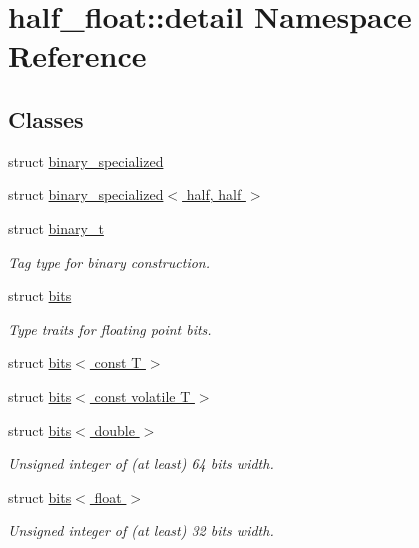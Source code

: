 \hypertarget{namespacehalf__float_1_1detail}{}\section{half\+\_\+float\+:\+:detail Namespace Reference}
\label{namespacehalf__float_1_1detail}
\subsection*{Classes}
\begin{DoxyCompactItemize}
\item 
struct \hyperlink{structhalf__float_1_1detail_1_1binary__specialized}{binary\+\_\+specialized}
\item 
struct \hyperlink{structhalf__float_1_1detail_1_1binary__specialized_3_01half_00_01half_01_4}{binary\+\_\+specialized$<$ half, half $>$}
\item 
struct \hyperlink{structhalf__float_1_1detail_1_1binary__t}{binary\+\_\+t}
\begin{DoxyCompactList}\small\item\em Tag type for binary construction. \end{DoxyCompactList}\item 
struct \hyperlink{structhalf__float_1_1detail_1_1bits}{bits}
\begin{DoxyCompactList}\small\item\em Type traits for floating point bits. \end{DoxyCompactList}\item 
struct \hyperlink{structhalf__float_1_1detail_1_1bits_3_01const_01T_01_4}{bits$<$ const T $>$}
\item 
struct \hyperlink{structhalf__float_1_1detail_1_1bits_3_01const_01volatile_01T_01_4}{bits$<$ const volatile T $>$}
\item 
struct \hyperlink{structhalf__float_1_1detail_1_1bits_3_01double_01_4}{bits$<$ double $>$}
\begin{DoxyCompactList}\small\item\em Unsigned integer of (at least) 64 bits width. \end{DoxyCompactList}\item 
struct \hyperlink{structhalf__float_1_1detail_1_1bits_3_01float_01_4}{bits$<$ float $>$}
\begin{DoxyCompactList}\small\item\em Unsigned integer of (at least) 32 bits width. \end{DoxyCompactList}\item 

\end{DoxyCompactItemize}
